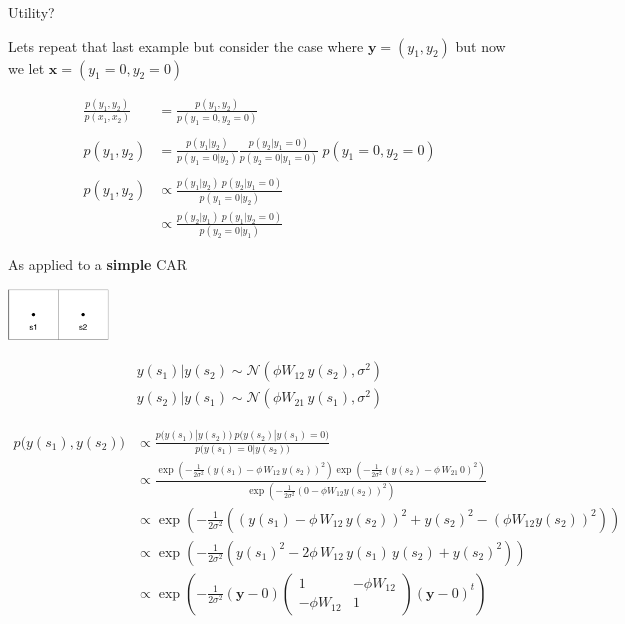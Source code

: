 \documentclass[11pt,ignorenonframetext,]{beamer}
\begin{document}
\begin{frame}[t]{Utility?}

Lets repeat that last example but consider the case where
\(\bm{y} = (y_1,y_2)\) but now we let \(\bm{x} = (y_1=0,y_2=0)\)

\[ \begin{aligned}
\frac{p (y_1,y_2) }{p(x_1,x_2)} 
  &= \frac{p (y_1,y_2) }{p(y_1=0,y_2=0)}  \\
\\
p(y_1,y_2) &= \frac{p(y_1 | y_2)}{p(y_1=0 | y_2)} \frac{p(y_2|y_1=0)}{p(y_2=0|y_1=0)} ~ p(y_1=0,y_2=0) \\
\\
p(y_1,y_2) 
  &\propto \frac{p(y_1 | y_2) ~ p(y_2|y_1=0) }{ p(y_1=0 | y_2)} \\
  &\propto \frac{p(y_2 | y_1) ~ p(y_1|y_2=0) }{ p(y_2=0 | y_1)}
\end{aligned} \]

\end{frame}

\begin{frame}[t]{As applied to a \textbf{simple} CAR}

\begin{center}\includegraphics[width=0.2\textwidth]{Lec18_files/figure-beamer/unnamed-chunk-8-1} \end{center}

\scriptsize
\[ \begin{aligned}
y(s_1) | y(s_2) \sim \mathcal{N}(\phi W_{12}\, y(s_2), \sigma^2) \\
y(s_2) | y(s_1) \sim \mathcal{N}(\phi W_{21}\, y(s_1), \sigma^2)
\end{aligned}\]

\pause

\[\begin{aligned}
p\big(y(s_1),y(s_2)\big) 
  &\propto \frac{p\big(y(s_1) | y(s_2)\big) ~ p\big(y(s_2)|y(s_1)=0\big)}{p\big(y(s_1)=0|y(s_2)\big)}\\
  &\propto 
    \frac{
      \exp\left(-\frac{1}{2\sigma^2}\left(y(s_1)-\phi \, W_{12} \, y(s_2)\right)^2\right)
      \exp\left(-\frac{1}{2\sigma^2}\left(y(s_2)-\phi \, W_{21} \, 0\right)^2\right) 
    }{
      \exp\left(-\frac{1}{2\sigma^2}\left(0-\phi W_{12} y(s_2)\right)^2 \right)
    }\\
  &\propto \exp\left(-\frac{1}{2\sigma^2}\left(\left(y(s_1)-\phi \, W_{12} \, y(s_2)\right)^2 + y(s_2)^2- (\phi W_{12} y(s_2))^2\right)\right) \\
  &\propto \exp\left(-\frac{1}{2\sigma^2}\left(y(s_1)^2-2\phi \, W_{12} \, y(s_1)\,y(s_2) + y(s_2)^2\right)\right) \\
  &\propto \exp\left(-\frac{1}{2\sigma^2} (\bm{y}-0)
    \begin{pmatrix} 
    1 & -\phi W_{12} \\
    -\phi W_{12} & 1
    \end{pmatrix}
    (\bm{y}-0)^{t}
  \right)
\end{aligned}\]

\end{frame}
\end{document}
